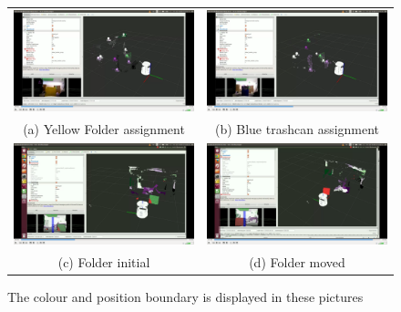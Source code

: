 \documentclass[twoside,hidelinks]{article}
\begin{document}
\begin{figure}

\begin{tabular}{cc}
  \includegraphics[width=.55\textwidth]{colorBound} &   \includegraphics[width=.55\textwidth]{colorBound2} \\
(a) Yellow Folder assignment  & (b) Blue trashcan assignment \\[6pt]
	\includegraphics[width=.55\textwidth]{posBound} &   \includegraphics[width=.55\textwidth]{posBound2} \\
(c) Folder initial  & (d) Folder moved \\[6pt]
\end{tabular}
\caption{The colour and position boundary is displayed in these pictures}
  \label{pip:bounds}
\end{figure}
\end{document}
